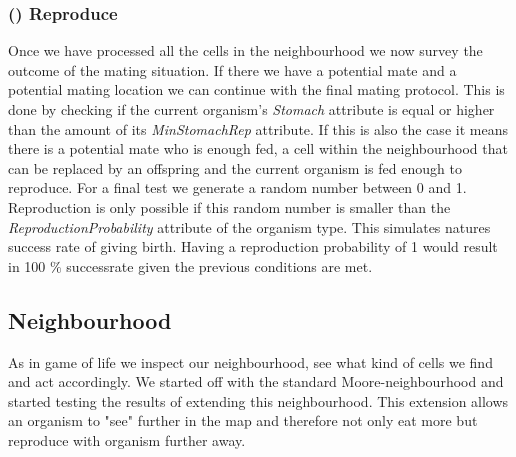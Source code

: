 \documentclass[11pt]{article}
\begin{document}
\addtocounter{protocolCounter}{1}
\subsubsection{() Reproduce}
\label{tab:reproduction}
Once we have processed all the cells in the neighbourhood we now survey the outcome of the mating situation. If there we have a potential mate and a potential mating location we can continue with the final mating protocol. This is done by checking if the current organism's {\it Stomach} attribute is equal or higher than the amount of its {\it MinStomachRep} attribute. If this is also the case it means there is a potential mate who is enough fed, a cell within the neighbourhood that can be replaced by an offspring and the current organism is fed enough to reproduce. For a final test we generate a random number between 0 and 1. Reproduction is only possible if this random number is smaller than the {\it ReproductionProbability} attribute of the organism type. This simulates natures success rate of giving birth. Having a reproduction probability of 1 would result in 100 $\%$ successrate given the previous conditions are met.

 
\subsection{Neighbourhood}
\label{sec:neighbourhood}
As in game of life we inspect our neighbourhood, see what kind of cells we find and act accordingly. 
We started off with the standard Moore-neighbourhood and started testing the results of extending this neighbourhood. This extension allows an organism to "see" further in the map and therefore not only eat more but reproduce with organism further away.
\end{document}
